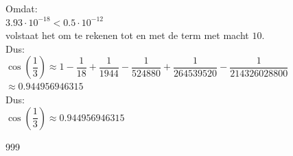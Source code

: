 \documentclass[a4paper]{article}
\begin{document}
Omdat: \\

$ 3.93\cdot 10^{-18} < 0.5\cdot 10^{-12} $ \\

volstaat het om te rekenen tot en met de term met macht $10$. \\

Dus: \\

$ \cos\left(\dfrac{1}{3}\right)
\approx 1-\dfrac{1}{18}
+\dfrac{1}{1944}
-\dfrac{1}{524880}
+\dfrac{1}{264539520}
-\dfrac{1}{214326028800} $ \\

$ \approx 0.944956946315 $ \\

Dus: \\

$ \boxed{\cos\left(\dfrac{1}{3}\right) \approx 0.944956946315} $ \\

\begin{thebibliography}{999}
\end{thebibliography}
\end{document}
